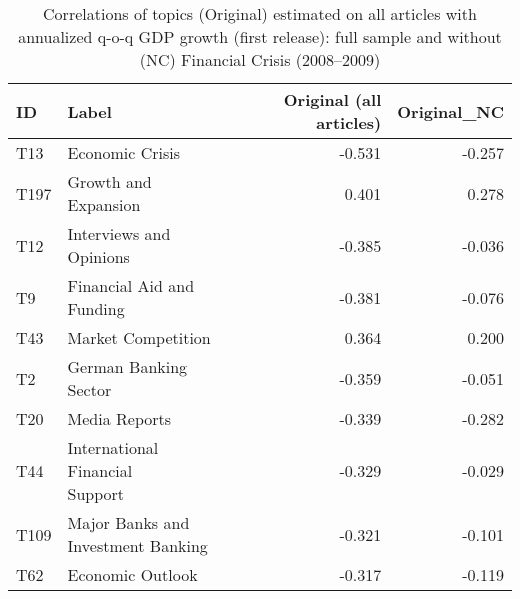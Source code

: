 \begin{table}[!h]
\centering
\caption{Correlations of topics (Original) estimated on all articles with annualized q-o-q GDP growth (first release): full sample and without (NC) Financial Crisis (2008–2009) \label{cor_gdp_topics_all_articles}}
\centering
\begin{tabular}[t]{llrr}
\toprule
ID & Label & Original (all articles) & Original\_NC\\
\midrule
T13 & Economic Crisis & -0.531 & -0.257\\
T197 & Growth and Expansion & 0.401 & 0.278\\
T12 & Interviews and Opinions & -0.385 & -0.036\\
T9 & Financial Aid and Funding & -0.381 & -0.076\\
T43 & Market Competition & 0.364 & 0.200\\
\addlinespace
T2 & German Banking Sector & -0.359 & -0.051\\
T20 & Media Reports & -0.339 & -0.282\\
T44 & \makecell[tl]{International Financial \\ Support} & -0.329 & -0.029\\
T109 & \makecell[tl]{Major Banks and \\ Investment Banking} & -0.321 & -0.101\\
T62 & Economic Outlook & -0.317 & -0.119\\
\bottomrule
\end{tabular}
\end{table}

